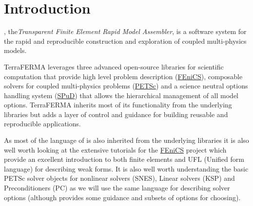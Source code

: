 %
%
%
%
%

\chapter{Introduction}

\TF{},  the\emph{Transparent Finite Element Rapid Model Assembler}, is
a software system for the rapid and reproducible construction and exploration of coupled multi-physics models.

TerraFERMA leverages three advanced open-source libraries for
scientific computation that provide high level problem description
(\href{http://fenicsproject.org}{FEniCS}), composable solvers for
coupled multi-physics problems
(\href{https://www.mcs.anl.gov/petsc}{PETSc}) and a science neutral
options handling system
(\href{https://www.imperial.ac.uk/engineering/departments/earth-science/research/research-groups/amcg/software/spud}{SPuD})
that allows the hierarchical management of all model
options. TerraFERMA inherits most of its functionality from the
underlying libraries but adds a layer of control and guidance for
building reusable and reproducible applications.

As most of the language of \TF{} is also inherited from the underlying
libraries it is also well worth looking at the extensive tutorials for
the \href{http://fenicsproject.org/documentation/tutorial}{FEniCS} project which provide an
excellent introduction to both finite elements and UFL (Unified form
language) for describing weak forms.  It is also well worth
understanding the basic PETSc solver objects for nonlinear solvers
(SNES), Linear solvers (KSP) and Preconditioners (PC) as we will use
the same language for describing solver options (although \TF{}
provides some guidance and subsets of options for choosing).

